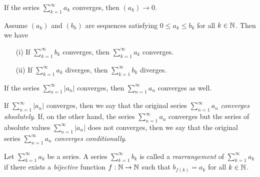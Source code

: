\begin{tcolorbox}
\begin{thm}
If the series \(\sum_{k=1}^{\infty} a_k  \) converges, then \( (a_k) \to 0 \).
\end{thm}
\end{tcolorbox}

\begin{tcolorbox}
    \begin{thm}
Assume \((a_k)\) and \((b_k)\) are sequences satisfying \( 0 \leq a_k \leq b_k \) for all \( k \in \mathbb{N} \). Then we have 

\begin{enumerate}
    \item[(i)] If \( \sum_{k=1}^{\infty}b_k\) converges, then \( \sum_{k=1}^{\infty} a_k\) converges.
    \item[(ii)] If \( \sum_{k=1}^{\infty} a_k\) diverges, then \( \sum_{k=1}^{\infty} b_k\) diverges.
\end{enumerate}
\end{thm}
\end{tcolorbox}

\begin{tcolorbox}
    \begin{thm}
    If the series \( \sum_{n=1}^{\infty} |a_n| \) converges, then \( \sum_{n=1}^{\infty} a_n\) converges as well.
\end{thm}
\end{tcolorbox}

\begin{tcolorbox}
\begin{defn}
If \( \sum_{n=1}^{\infty} |a_n| \) converges, then we say that the original series \( \sum_{n=1}^{\infty} a_n \) \textit{converges absolutely}. If, on the other hand, the series \( \sum_{n=1}^{\infty} a_n \) converges but the series of absolute values \( \sum_{n=1}^{\infty} |a_n|\) does not converges, then we say that the original series \(\sum_{n=1}^{\infty} a_n \) \textit{converges conditionally}.
\end{defn}
\end{tcolorbox}

\begin{tcolorbox}
\begin{defn}
    Let \( \sum_{k=1}^{\infty} a_k\) be a series. A series \( \sum_{k=1}^{\infty} b_k\) is called a \textit{rearrangement} of \(\sum_{k=1}^{\infty} a_k \) if there exists a \textit{bijective} function \(f: \mathbb{N} \to \mathbb{N} \) such that \( b_{f(k)} = a_k \) for all \( k \in \mathbb{N} \).
\end{defn}
\end{tcolorbox}


